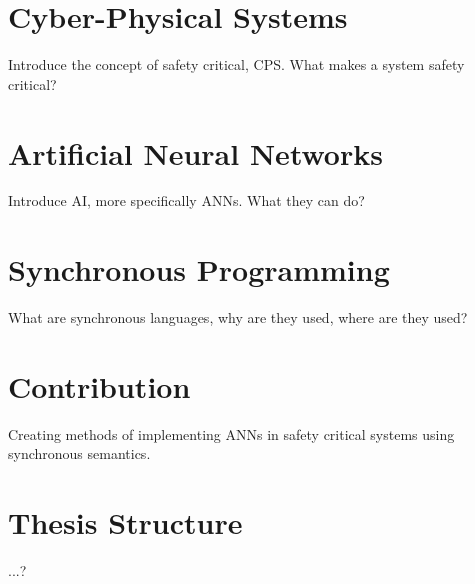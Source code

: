 \section{Cyber-Physical Systems}
Introduce the concept of safety critical, CPS. What makes a system safety critical?

\section{Artificial Neural Networks}
Introduce AI, more specifically ANNs. What they can do?

\section{Synchronous Programming}
What are synchronous languages, why are they used, where are they used?

\section{Contribution}
Creating methods of implementing ANNs in safety critical systems using synchronous semantics.

\section{Thesis Structure}
...?
